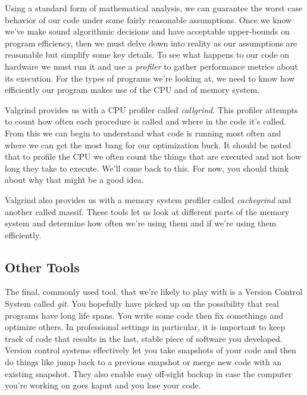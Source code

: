 \documentclass[]{tufte-handout}
\begin{document}
Using a standard form of mathematical analysis, we can guarantee the worst case behavior of our code under some fairly reasonable assumptions. Once we know we've make sound algorithmic decisions and have acceptable upper-bounds on program efficiency, then we must delve down into reality as our assumptions are reasonable but simplify some key details. To see what happens to our code on hardware we must run it and use a \textit{profiler} to gather performance metrics about its execution.  For the types of programs we're looking at, we need to know how efficiently our program makes use of the CPU and of memory system.

Valgrind provides us with a CPU profiler called \textit{callgrind}. This profiler attempts to count how often each procedure is called and where in the code it's called.  From this we can begin to understand what code is running most often and where we can get the most bang for our optimization buck.  It should be noted that to profile the CPU we often count the things that are executed and not how long they take to execute.  We'll come back to this. For now, you should think about why that might be a good idea.  

Valgrind also provides us with a memory system profiler called \textit{cachegrind} and another called {massif}.  These tools let us look at different parts of the memory system and determine how often we're using them and if we're using them efficiently.       

\subsection{Other Tools}

The final, commonly used tool, that we're likely to play with is a Version Control System called \textit{git}. You hopefully have picked up on the possibility that real programs have long life spans.  You write some code then fix somethings and optimize others.  In professional settings in particular, it is important to keep track of code that results in the last, stable piece of software you developed.  Version control systems effectively let you take snapshots of your code and then do things like jump back to a previous snapshot or merge new code with an existing snapshot.  They also enable easy off-sight backup in case the computer you're working on goes kaput and you lose your code.
\end{document}
